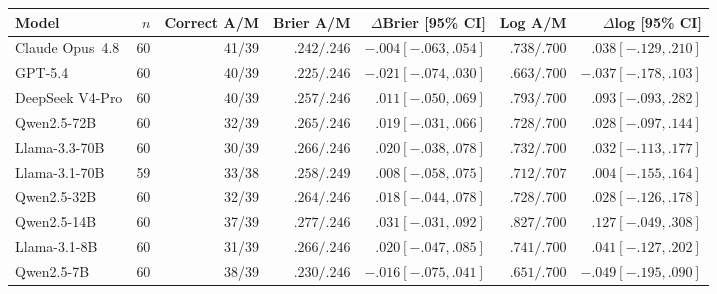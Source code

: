 \begin{tabular}{lrrrrrr}
\toprule
\textbf{Model} & \textbf{$n$} & \textbf{Correct A/M} & \textbf{Brier A/M} & \textbf{$\Delta$Brier [95\% CI]} & \textbf{Log A/M} & \textbf{$\Delta$log [95\% CI]} \\
\midrule
Claude Opus~4.8 & 60 & 41/39 & $.242/.246$ & $-.004 [-.063,.054]$ & $.738/.700$ & $.038 [-.129,.210]$ \\
GPT-5.4 & 60 & 40/39 & $.225/.246$ & $-.021 [-.074,.030]$ & $.663/.700$ & $-.037 [-.178,.103]$ \\
DeepSeek V4-Pro & 60 & 40/39 & $.257/.246$ & $.011 [-.050,.069]$ & $.793/.700$ & $.093 [-.093,.282]$ \\
\midrule
Qwen2.5-72B & 60 & 32/39 & $.265/.246$ & $.019 [-.031,.066]$ & $.728/.700$ & $.028 [-.097,.144]$ \\
Llama-3.3-70B & 60 & 30/39 & $.266/.246$ & $.020 [-.038,.078]$ & $.732/.700$ & $.032 [-.113,.177]$ \\
Llama-3.1-70B & 59 & 33/38 & $.258/.249$ & $.008 [-.058,.075]$ & $.712/.707$ & $.004 [-.155,.164]$ \\
Qwen2.5-32B & 60 & 32/39 & $.264/.246$ & $.018 [-.044,.078]$ & $.728/.700$ & $.028 [-.126,.178]$ \\
Qwen2.5-14B & 60 & 37/39 & $.277/.246$ & $.031 [-.031,.092]$ & $.827/.700$ & $.127 [-.049,.308]$ \\
Llama-3.1-8B & 60 & 31/39 & $.266/.246$ & $.020 [-.047,.085]$ & $.741/.700$ & $.041 [-.127,.202]$ \\
Qwen2.5-7B & 60 & 38/39 & $.230/.246$ & $-.016 [-.075,.041]$ & $.651/.700$ & $-.049 [-.195,.090]$ \\
\bottomrule
\end{tabular}
